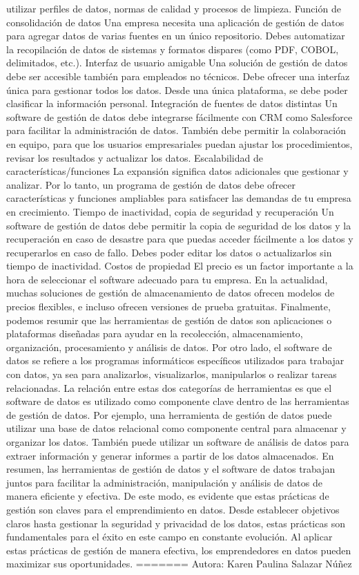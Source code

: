 \documentclass[
  letterpaper,
  DIV=11,
  numbers=noendperiod]{scrreprt}
\begin{document}
utilizar perfiles de datos, normas de calidad y procesos de limpieza.
Función de consolidación de datos Una empresa necesita una aplicación de
gestión de datos para agregar datos de varias fuentes en un único
repositorio. Debes automatizar la recopilación de datos de sistemas y
formatos dispares (como PDF, COBOL, delimitados, etc.). Interfaz de
usuario amigable Una solución de gestión de datos debe ser accesible
también para empleados no técnicos. Debe ofrecer una interfaz única para
gestionar todos los datos. Desde una única plataforma, se debe poder
clasificar la información personal. Integración de fuentes de datos
distintas Un software de gestión de datos debe integrarse fácilmente con
CRM como Salesforce para facilitar la administración de datos. También
debe permitir la colaboración en equipo, para que los usuarios
empresariales puedan ajustar los procedimientos, revisar los resultados
y actualizar los datos. Escalabilidad de características/funciones La
expansión significa datos adicionales que gestionar y analizar. Por lo
tanto, un programa de gestión de datos debe ofrecer características y
funciones ampliables para satisfacer las demandas de tu empresa en
crecimiento. Tiempo de inactividad, copia de seguridad y recuperación Un
software de gestión de datos debe permitir la copia de seguridad de los
datos y la recuperación en caso de desastre para que puedas acceder
fácilmente a los datos y recuperarlos en caso de fallo. Debes poder
editar los datos o actualizarlos sin tiempo de inactividad. Costos de
propiedad El precio es un factor importante a la hora de seleccionar el
software adecuado para tu empresa. En la actualidad, muchas soluciones
de gestión de almacenamiento de datos ofrecen modelos de precios
flexibles, e incluso ofrecen versiones de prueba gratuitas. Finalmente,
podemos resumir que las herramientas de gestión de datos son
aplicaciones o plataformas diseñadas para ayudar en la recolección,
almacenamiento, organización, procesamiento y análisis de datos. Por
otro lado, el software de datos se refiere a los programas informáticos
específicos utilizados para trabajar con datos, ya sea para analizarlos,
visualizarlos, manipularlos o realizar tareas relacionadas. La relación
entre estas dos categorías de herramientas es que el software de datos
es utilizado como componente clave dentro de las herramientas de gestión
de datos. Por ejemplo, una herramienta de gestión de datos puede
utilizar una base de datos relacional como componente central para
almacenar y organizar los datos. También puede utilizar un software de
análisis de datos para extraer información y generar informes a partir
de los datos almacenados. En resumen, las herramientas de gestión de
datos y el software de datos trabajan juntos para facilitar la
administración, manipulación y análisis de datos de manera eficiente y
efectiva. De este modo, es evidente que estas prácticas de gestión son
claves para el emprendimiento en datos. Desde establecer objetivos
claros hasta gestionar la seguridad y privacidad de los datos, estas
prácticas son fundamentales para el éxito en este campo en constante
evolución. Al aplicar estas prácticas de gestión de manera efectiva, los
emprendedores en datos pueden maximizar sus oportunidades. =======
Autora: Karen Paulina Salazar Núñez
\end{document}
